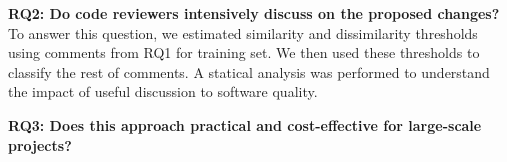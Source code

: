 \documentclass[conference]{IEEEtran}
\begin{document}
%


\noindent \textbf{RQ2: Do code reviewers intensively discuss on the proposed changes?}\\
\indent To answer this question, we estimated similarity and dissimilarity thresholds using comments from RQ1 for training set. We then used these thresholds to classify the rest of comments. A statical analysis was performed to understand the impact of useful discussion to software quality.

\noindent \textbf{RQ3: Does this approach practical and cost-effective for large-scale projects?}\\
\indent








\end{document}

